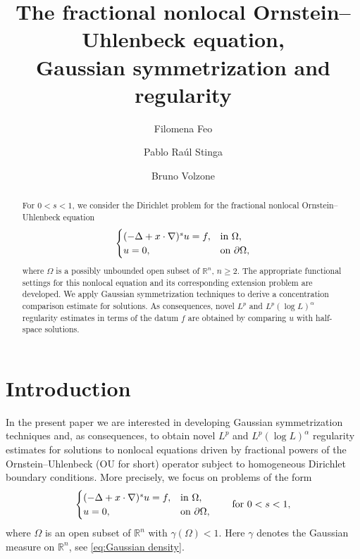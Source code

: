 \documentclass[a4paper,10pt,reqno]{amsart}
\author[F. Feo]{Filomena Feo}
\author[P. R. Stinga]{Pablo Ra\'ul Stinga}
\author[B. Volzone]{Bruno Volzone}
\newcommand{\R}{\mathbb{R}}
\numberwithin{equation}{section}
\begin{document}
\title[Fractional nonlocal Ornstein--Uhlenbeck equation]{The fractional
nonlocal Ornstein--Uhlenbeck equation, \\ Gaussian symmetrization and regularity}

\begin{abstract}
For $0<s<1$, we consider the Dirichlet problem for the fractional nonlocal Ornstein--Uhlenbeck equation
$$\begin{cases}
(-\Delta+x\cdot\nabla)^su=f,&\hbox{in}~\Omega,\\
u=0,&\hbox{on}~\partial\Omega,
\end{cases}$$
where $\Omega$ is a possibly unbounded open subset of $\R^n$, $n\geq2$.
The appropriate functional settings for this nonlocal equation and its corresponding extension problem are developed.
We apply Gaussian symmetrization techniques to derive a concentration comparison estimate for solutions.
As consequences, novel $L^p$ and $L^p(\log L)^\alpha$
regularity estimates in terms of the datum $f$ are obtained
by comparing $u$ with half-space solutions.
\end{abstract}

\maketitle

\section{Introduction}

In the present paper we are interested in developing Gaussian symmetrization techniques and, as consequences, to
obtain novel $L^p$ and $L^p(\log L)^\alpha$ regularity estimates for solutions to
nonlocal equations driven by fractional powers of the Ornstein--Uhlenbeck (OU for short) operator subject to homogeneous
Dirichlet boundary conditions.
More precisely, we focus on problems of the form
\begin{equation}\label{Problema}
\begin{cases}
(-\Delta+x\cdot\nabla)^su=f,&\hbox{in}~\Omega,\\
u=0,&\hbox{on}~\partial\Omega,
\end{cases}\qquad\hbox{for}~0<s<1,
\end{equation}
where $\Omega$ is an open subset of
$\mathbb{R}^{n}$ with $\gamma(\Omega)<1$. Here $\gamma$ denotes the Gaussian measure on $\R^{n}$, see \eqref{eq:Gaussian density}.
\end{document}
